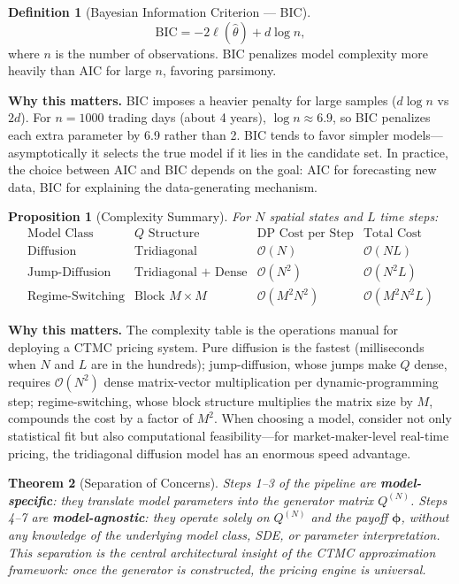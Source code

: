 \documentclass[11pt,a4paper,openany]{book}
\theoremstyle{definition}
\newtheorem{definition}{Definition}[chapter]
\theoremstyle{plain}
\newtheorem{theorem}{Theorem}[chapter]
\newtheorem{proposition}[theorem]{Proposition}
\theoremstyle{remark}
\newcommand{\1}{\mathbbm{1}}
\begin{document}
\begin{definition}[Bayesian Information Criterion --- BIC]
\[
\text{BIC} = -2 \ell(\hat{\theta}) + d \log n,
\]
where $n$ is the number of observations. BIC penalizes model complexity more heavily than AIC for large $n$, favoring parsimony.
\end{definition}

\medskip
\noindent\textbf{Why this matters.} BIC imposes a heavier penalty for large samples ($d\log n$ vs $2d$). For $n=1000$ trading days (about 4 years), $\log n \approx 6.9$, so BIC penalizes each extra parameter by 6.9 rather than 2. BIC tends to favor simpler models---asymptotically it selects the true model if it lies in the candidate set. In practice, the choice between AIC and BIC depends on the goal: AIC for forecasting new data, BIC for explaining the data-generating mechanism.

\begin{proposition}[Complexity Summary]
For $N$ spatial states and $L$ time steps:
\[
\begin{array}{c|c|c|c}
\text{Model Class} & Q \text{ Structure} & \text{DP Cost per Step} & \text{Total Cost} \\
\hline
\text{Diffusion} & \text{Tridiagonal} & \mathcal{O}(N) & \mathcal{O}(NL) \\
\text{Jump-Diffusion} & \text{Tridiagonal + Dense} & \mathcal{O}(N^{2}) & \mathcal{O}(N^{2}L) \\
\text{Regime-Switching} & \text{Block $M \times M$} & \mathcal{O}(M^{2} N^{2}) & \mathcal{O}(M^{2} N^{2} L)
\end{array}
\]
\end{proposition}

\medskip
\noindent\textbf{Why this matters.} The complexity table is the operations manual for deploying a CTMC pricing system. Pure diffusion is the fastest (milliseconds when $N$ and $L$ are in the hundreds); jump-diffusion, whose jumps make $Q$ dense, requires $\mathcal{O}(N^2)$ dense matrix-vector multiplication per dynamic-programming step; regime-switching, whose block structure multiplies the matrix size by $M$, compounds the cost by a factor of $M^2$. When choosing a model, consider not only statistical fit but also computational feasibility---for market-maker-level real-time pricing, the tridiagonal diffusion model has an enormous speed advantage.

\begin{theorem}[Separation of Concerns]
Steps 1--3 of the pipeline are \textbf{model-specific}: they translate model parameters into the generator matrix $Q^{(N)}$. Steps 4--7 are \textbf{model-agnostic}: they operate solely on $Q^{(N)}$ and the payoff $\boldsymbol{\phi}$, without any knowledge of the underlying model class, SDE, or parameter interpretation. This separation is the central architectural insight of the CTMC approximation framework: once the generator is constructed, the pricing engine is universal.
\end{theorem}
\end{document}
